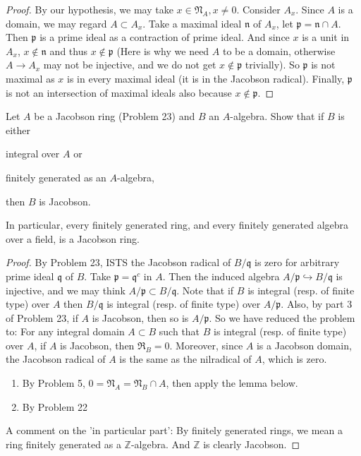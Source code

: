 \documentclass{solution}
\begin{document}
\begin{proof}
    By our hypothesis, we may take $x \in \mathfrak{N}_A, x \ne 0$. Consider $A_x$. Since $A$ is a domain, we may regard $A \subset A_x$. Take a maximal ideal $\mathfrak{n}$ of $A_x$, let $\mathfrak{p} = \mathfrak{n} \cap A$. Then $\mathfrak{p}$ is a prime ideal as a contraction of prime ideal. And since $x$ is a unit in $A_x$, $x \notin \mathfrak{n}$ and thus $x \notin \mathfrak{p}$ ({\color{red}Here is why we need $A$ to be a domain, otherwise $A \rightarrow A_x$ may not be injective, and we do not get $x \notin \mathfrak{p}$ trivially}). So $\mathfrak{p}$ is not maximal as $x$ is in every maximal ideal (it is in the Jacobson radical). Finally, $\mathfrak{p}$ is not an intersection of maximal ideals also because $x \notin \mathfrak{p}$.
\end{proof}

\begin{problem}
    Let $A$ be a Jacobson ring (Problem 23) and $B$ an $A$-algebra. Show that if $B$ is either \begin{inparaenum}
        \item integral over $A$ or
        \item finitely generated as an $A$-algebra,
    \end{inparaenum} then $B$ is Jacobson.

    In particular, every finitely generated ring, and every finitely generated algebra over a field, is a Jacobson ring.
\end{problem}

\begin{proof}
    By Problem 23, ISTS the Jacobson radical of $B / \mathfrak{q}$ is zero for arbitrary prime ideal $\mathfrak{q}$ of $B$. Take $\mathfrak{p} = \mathfrak{q}^c$ in $A$. Then the induced algebra $A / \mathfrak{p} \hookrightarrow B / \mathfrak{q}$ is injective, and we may think $A / \mathfrak{p} \subset B / \mathfrak{q}$. Note that if $B$ is integral (resp. of finite type) over $A$ then $B / \mathfrak{q}$ is integral (resp. of finite type) over $A / \mathfrak{p}$. Also, by part 3 of Problem 23, if $A$ is Jacobson, then so is $A / \mathfrak{p}$. So we have reduced the problem to: For any integral domain $A \subset B$ such that $B$ is integral (resp. of finite type) over $A$, if $A$ is Jacobson, then $\mathfrak{R}_B = 0$. Moreover, since $A$ is a Jacobson domain, the Jacobson radical of $A$ is the same as the nilradical of $A$, which is zero.

    \begin{enumerate}
        \item By Problem 5, $0 = \mathfrak{N}_A = \mathfrak{N}_B \cap A$, then apply the lemma below.
        \item By Problem 22
    \end{enumerate}

    A comment on the 'in particular part': By finitely generated rings, we mean a ring finitely generated as a $\mathbb{Z}$-algebra. And $\mathbb{Z}$ is clearly Jacobson.
\end{proof}
\end{document}
